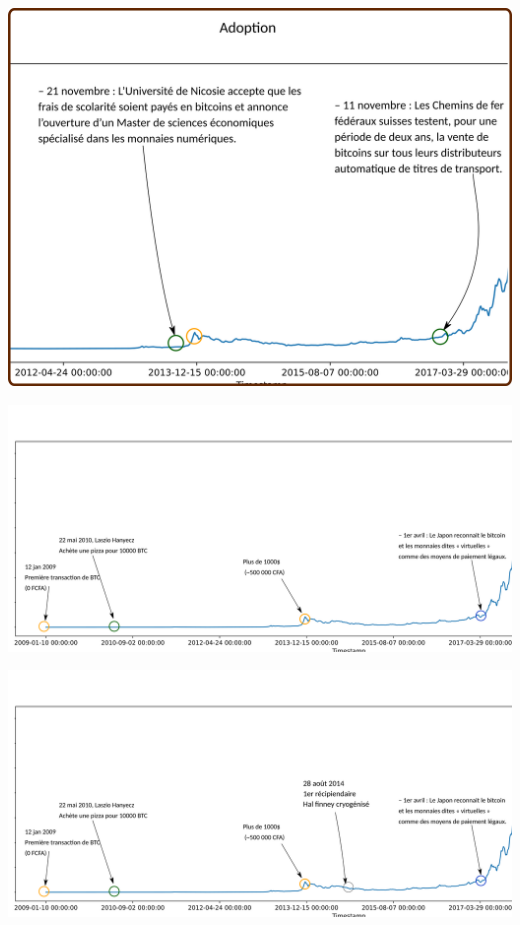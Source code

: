\documentclass[presentation]{beamer}
\begin{document}
\begin{frame}[label={sec:org07b8e4a}]{}
\begin{center}
\includegraphics[width=.95\textwidth]{./Pictures/Timeline/26adoption_train.png}
\end{center}
\end{frame}

\begin{frame}[label={sec:org422439f}]{}
\begin{center}
\includegraphics[width=1\textwidth]{./Pictures/Timeline/30hal_finney.png}
\end{center}
\end{frame}

\begin{frame}[label={sec:org32f6d7a}]{}
\begin{center}
\includegraphics[width=1\textwidth]{./Pictures/Timeline/31hal_finney.png}
\end{center}
\end{frame}
\end{document}
